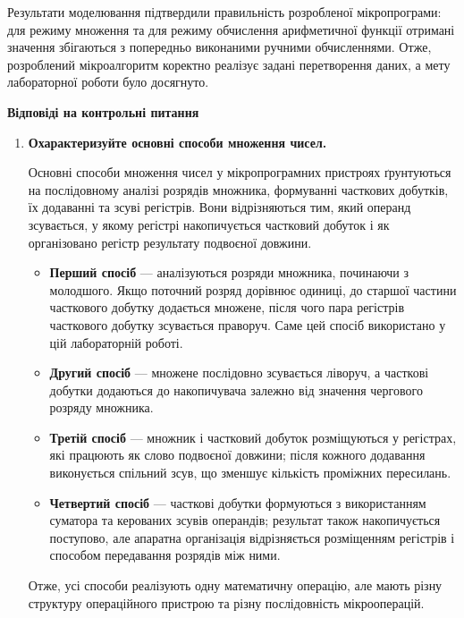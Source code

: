 \documentclass[12pt,a4paper]{article}
\begin{document}
    Результати моделювання підтвердили правильність розробленої мікропрограми: для режиму множення та для режиму обчислення арифметичної функції отримані значення збігаються з попередньо виконаними ручними обчисленнями. Отже, розроблений мікроалгоритм коректно реалізує задані перетворення даних, а мету лабораторної роботи було досягнуто.

    \newpage

    \begin{center} \textbf{\large Відповіді на контрольні питання}\end{center}

    \begin{enumerate}
        \item \textbf{Охарактеризуйте основні способи множення чисел.}

        Основні способи множення чисел у мікропрограмних пристроях ґрунтуються на послідовному аналізі розрядів множника, формуванні часткових добутків, їх додаванні та зсуві регістрів. Вони відрізняються тим, який операнд зсувається, у якому регістрі накопичується частковий добуток і як організовано регістр результату подвоєної довжини.

        \begin{itemize}
            \item \textbf{Перший спосіб} --- аналізуються розряди множника, починаючи з молодшого. Якщо поточний розряд дорівнює одиниці, до старшої частини часткового добутку додається множене, після чого пара регістрів часткового добутку зсувається праворуч. Саме цей спосіб використано у цій лабораторній роботі.
            \item \textbf{Другий спосіб} --- множене послідовно зсувається ліворуч, а часткові добутки додаються до накопичувача залежно від значення чергового розряду множника.
            \item \textbf{Третій спосіб} --- множник і частковий добуток розміщуються у регістрах, які працюють як слово подвоєної довжини; після кожного додавання виконується спільний зсув, що зменшує кількість проміжних пересилань.
            \item \textbf{Четвертий спосіб} --- часткові добутки формуються з використанням суматора та керованих зсувів операндів; результат також накопичується поступово, але апаратна організація відрізняється розміщенням регістрів і способом передавання розрядів між ними.
        \end{itemize}

        Отже, усі способи реалізують одну математичну операцію, але мають різну структуру операційного пристрою та різну послідовність мікрооперацій.


\end{enumerate}
\end{document}

